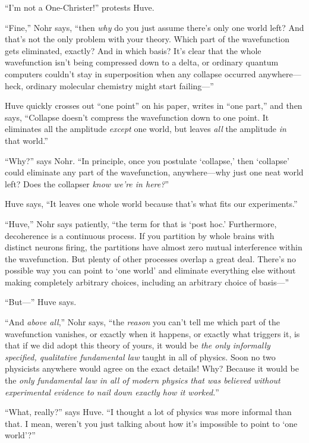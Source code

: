 {
 ``I'm not a
One-Christer!'' protests Huve.}

{
 ``Fine,'' Nohr says,
``then \textit{why} do you just assume
there's only one world left? And that's
not the only problem with your theory. Which part of the wavefunction
gets eliminated, exactly? And in which basis? It's
clear that the whole wavefunction isn't being
compressed down to a delta, or ordinary quantum computers
couldn't stay in superposition when any collapse
occurred anywhere---heck, ordinary molecular chemistry might start
failing---''}

{
 Huve quickly crosses out ``one
point'' on his paper, writes in
``one part,'' and then says,
``Collapse doesn't compress the
wavefunction down to one point. It eliminates all the amplitude
\textit{except} one world, but leaves \textit{all} the amplitude
\textit{in} that world.''}

{
 ``Why?'' says Nohr.
``In principle, once you postulate
`collapse,' then
`collapse' could eliminate any part of
the wavefunction, anywhere---why just one neat world left? Does the
collapser \textit{know we're in
here?}''}

{
 Huve says, ``It leaves one whole world because
that's what fits our experiments.''}

{
 ``Huve,'' Nohr says patiently,
``the term for that is `post
hoc.' Furthermore, decoherence is a continuous process.
If you partition by whole brains with distinct neurons firing, the
partitions have almost zero mutual interference within the
wavefunction. But plenty of other processes overlap a great deal.
There's no possible way you can point to
`one world' and eliminate everything
else without making completely arbitrary choices, including an
arbitrary choice of basis---''}

{
 ``But---'' Huve says.}

{
 ``And \textit{above all},''
Nohr says, ``the \textit{reason} you
can't tell me which part of the wavefunction vanishes,
or exactly when it happens, or exactly what triggers it, is that if we
did adopt this theory of yours, it would be \textit{the only informally
specified, qualitative fundamental law} taught in all of physics. Soon
no two physicists anywhere would agree on the exact details! Why?
Because it would be the \textit{only fundamental law in all of modern
physics that was believed without experimental evidence to nail down
exactly how it worked.}''}

{
 ``What, really?'' says Huve.
``I thought a lot of physics was more informal than
that. I mean, weren't you just talking about how
it's impossible to point to `one
world'?''}

